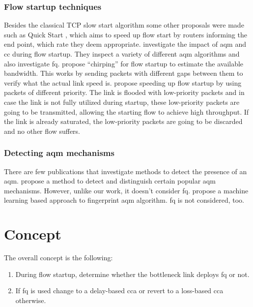 \documentclass[runningheads]{llncs}
\begin{document}
\subsubsection{Flow startup techniques} Besides the classical TCP slow start algorithm \cite{stevens_tcp_1997} some other proposals were made such as Quick Start \cite{jain_quick-start_2019}, which aims to speed up flow start by routers informing the end point, which rate they deem appropriate. \cite{jarvinen_congestion_2019} investigate the impact of \gls{aqm} and \gls{cc} during flow startup. They inspect a variety of different \gls{aqm} algorithms and also investigate \gls{fq}. \cite{kuhlewind_chirping_2010} propose ``chirping'' for flow startup to estimate the available bandwidth. This works by sending packets with different gaps between them to verify what the actual link speed is. \cite{mittal_recursively_2014} propose speeding up flow startup by using packets of different priority. The link is flooded with low-priority packets and in case the link is not fully utilized during startup, these low-priority packets are going to be transmitted, allowing the starting flow to achieve high throughput. If the link is already saturated, the low-priority packets are going to be discarded and no other flow suffers. 

\subsubsection{Detecting \gls{aqm} mechanisms} There are few publications that investigate methods to detect the presence of an \gls{aqm}. \cite{kargar_bideh_tada_2016} propose a method to detect and distinguish certain popular \gls{aqm} mechanisms. However, unlike our work, it doesn't consider \gls{fq}. \cite{baykal_detection_2017} propose a machine learning based approach to fingerprint \gls{aqm} algorithm. \gls{fq} is not considered, too. 

\section{Concept}
\label{sec:concept}

The overall concept is the following:
\begin{enumerate}
\item During flow startup, determine whether the bottleneck link deploys \gls{fq} or not.
\item If \gls{fq} is used change to a delay-based \gls{cca} or revert to a loss-based \gls{cca} otherwise.
\end{enumerate}
\end{document}
